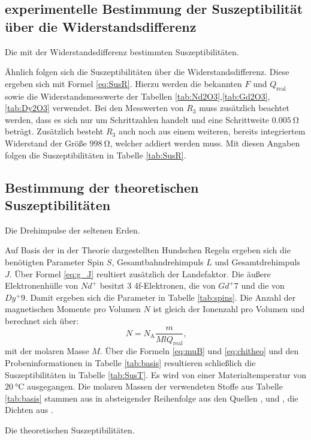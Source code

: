 \subsection{experimentelle Bestimmung der Suszeptibilität über die Widerstandsdifferenz}


\begin{table}
 \centering
 \caption{Die mit der Widerstandsdifferenz bestimmten Suszeptibilitäten.}
 
 \label{tab:SusR}
\end{table}


Ähnlich folgen sich die Suszeptibilitäten über die Widerstandsdifferenz. Diese ergeben sich mit Formel
\ref{eq:SusR}. Hierzu werden die bekannten $F$ und $Q_\text{real}$ sowie die Widerstandsmesswerte
der Tabellen \ref{tab:Nd2O3},\ref{tab:Gd2O3},\ref{tab:Dy2O3} verwendet.
Bei den Messwerten von $R_3$ muss zusätzlich beachtet werden, dass es sich nur
um Schrittzahlen handelt und eine Schrittweite $\SI{0.005}{\ohm}$ beträgt.
Zusätzlich besteht $R_3$ auch noch aus einem weiteren, bereits integriertem Widerstand
der Größe $\SI{998}{\ohm}$, welcher addiert werden muss. Mit diesen Angaben folgen die Suszeptibilitäten in Tabelle \ref{tab:SusR}.


\subsection{Bestimmung der theoretischen Suszeptibilitäten}

\begin{table}
 \centering
 \caption{Die Drehimpulse der seltenen Erden.}
 
 \label{tab:spins}
\end{table}


Auf Basis der in der Theorie dargestellten Hundschen Regeln ergeben sich die
benötigten Parameter Spin $S$, Gesamtbahndrehimpuls $L$ und Gesamtdrehimpuls $J$. Über Formel
\ref{eq:g_J} reultiert zusätzlich der Landefaktor. Die äußere Elektronenhülle von $Nd^+ $
besitzt 3 4f-Elektronen, die von $Gd^+ 7$ und die von
$Dy^+ 9$. Damit ergeben sich die Parameter in Tabelle \ref{tab:spins}.
Die Anzahl der magnetischen Momente pro Volumen $N$ ist gleich der Ionenzahl pro
Volumen und berechnet sich über:
\begin{equation}
  N = N_\text{A}\frac{m}{M l Q_\text{real}}\text{,}
\end{equation}
mit der molaren Masse $M$.
Über die Formeln \ref{eq:muB} und \ref{eq:chitheo} und den Probeninformationen in
Tabelle \ref{tab:basis} resultieren schließlich die Suszeptibilitäten in Tabelle \ref{tab:SusT}.
Es wird von einer Materialtemperatur von $\SI{20}{\degreeCelsius}$ ausgegangen. Die
molaren Massen der verwendeten Stoffe aus Tabelle \ref{tab:basis} stammen aus in
absteigender Reihenfolge aus den Quellen \cite{MNd2O3}, \cite{MGd2O3} und \cite{MDy2O3}, die Dichten aus \cite{V606}.

\begin{table}
 \centering
 \caption{Die theoretischen Suszeptibilitäten.}
 
 \label{tab:SusT}
\end{table}
